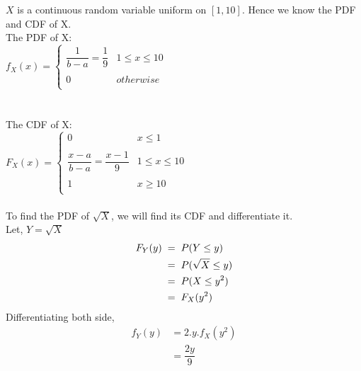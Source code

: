 \documentclass{article}
\begin{document}
\begin{enumerate}
  $X$ is a continuous random variable uniform on $[1, 10]$. Hence we know the PDF and CDF of X.\\
  The PDF of X:\\
  $f_X(x) =  {  \left\{
    \begin{array}{ll}
      {\dfrac{1}{b-a} = \dfrac{1}{9}}&  1\leq x\leq 10 \\\\
      0 & otherwise \\
    \end{array}
    \right. }$\\\\\\
  The CDF of X:\\
  $F_X(x) =  {  \left\{
    \begin{array}{ll}
      0 & x\leq 1 \\\\
      {\dfrac{x-a}{b-a} = \dfrac{x-1}{9} }&  1\leq x\leq 10 \\\\
      1 & x\geq 10 \\
    \end{array}
    \right. }$\\\\
  To find the PDF of $\sqrt{X}$, we will find its CDF and differentiate it.\\
  Let, $Y = \sqrt{X}$
  \begin{align*}
    F_Y(y)\hspace{1mm} =& \hspace{2mm}P(Y \leq y)\\
    =& \hspace{2mm}P(\sqrt{X} \leq y)\\
    =& \hspace{2mm}P(X \leq y^2)\\
    =& \hspace{2mm}F_X(y^2)
  \end{align*}
  Differentiating both side,
  \begin{align*}
    f_Y(y) &= 2.y.f_X(y^2)\\
    &= \dfrac{2y}{9}
  \end{align*}


\end{enumerate}
\end{document}
